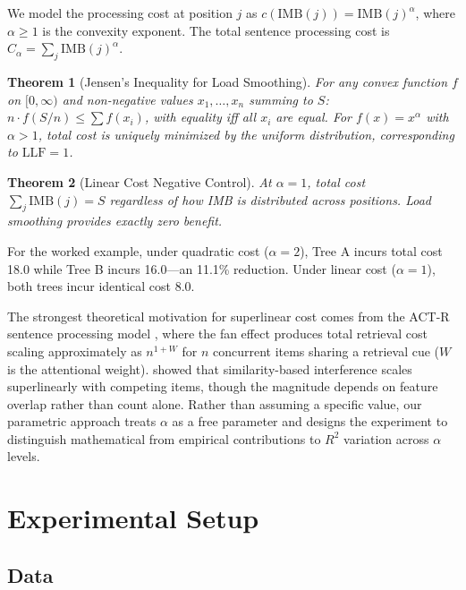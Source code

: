 \documentclass[11pt,letterpaper]{article}
\newtheorem{theorem}{Theorem}
\begin{document}
We model the processing cost at position $j$ as $c(\text{IMB}(j)) = \text{IMB}(j)^\alpha$, where $\alpha \geq 1$ is the convexity exponent. The total sentence processing cost is $C_\alpha = \sum_j \text{IMB}(j)^\alpha$.

\begin{theorem}[Jensen's Inequality for Load Smoothing]
\label{thm:jensen}
For any convex function $f$ on $[0, \infty)$ and non-negative values $x_1, \ldots, x_n$ summing to $S$: $n \cdot f(S/n) \leq \sum f(x_i)$, with equality iff all $x_i$ are equal. For $f(x) = x^\alpha$ with $\alpha > 1$, total cost is uniquely minimized by the uniform distribution, corresponding to $\text{LLF} = 1$.
\end{theorem}

\begin{theorem}[Linear Cost Negative Control]
\label{thm:linear}
At $\alpha = 1$, total cost $\sum_j \text{IMB}(j) = S$ regardless of how IMB is distributed across positions. Load smoothing provides exactly zero benefit.
\end{theorem}

For the worked example, under quadratic cost ($\alpha = 2$), Tree A incurs total cost 18.0 while Tree B incurs 16.0---an 11.1\% reduction. Under linear cost ($\alpha = 1$), both trees incur identical cost 8.0.

The strongest theoretical motivation for superlinear cost comes from the ACT-R sentence processing model \citep{Lewis2005}, where the fan effect produces total retrieval cost scaling approximately as $n^{1+W}$ for $n$ concurrent items sharing a retrieval cue ($W$ is the attentional weight). \citet{Gordon2002} showed that similarity-based interference scales superlinearly with competing items, though the magnitude depends on feature overlap rather than count alone. Rather than assuming a specific value, our parametric approach treats $\alpha$ as a free parameter and designs the experiment to distinguish mathematical from empirical contributions to $R^2$ variation across $\alpha$ levels.


\section{Experimental Setup}
\label{sec:setup}

\subsection{Data}
\end{document}
